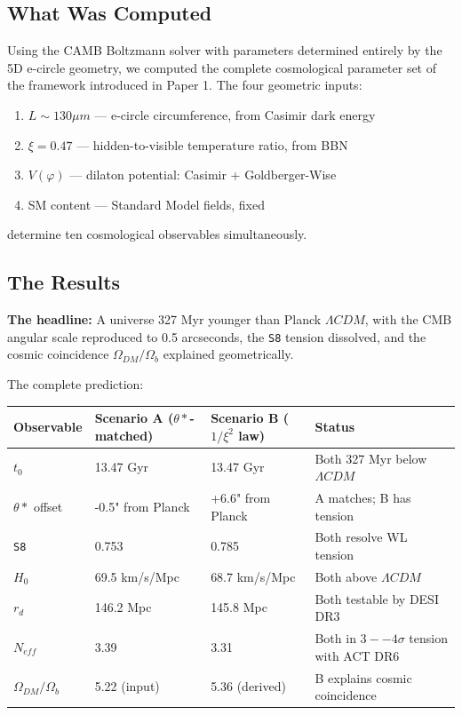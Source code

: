 \documentclass[aps,prd,preprint,superscriptaddress,longbibliography]{revtex4-2}
\begin{document}
\clearpage


\subsection{What Was Computed}

Using the CAMB Boltzmann solver with parameters determined entirely by the 5D e-circle geometry, we computed the complete cosmological parameter set of the framework introduced in Paper 1. The four geometric inputs:


\begin{enumerate}
  \item $L \sim  130 \mu m$ --- e-circle circumference, from Casimir dark energy
  \item $\xi = 0.47$ --- hidden-to-visible temperature ratio, from BBN
  \item $V(\varphi)$ --- dilaton potential: Casimir + Goldberger-Wise
  \item SM content --- Standard Model fields, fixed
\end{enumerate}

determine ten cosmological observables simultaneously.


\subsection{The Results}

\textbf{The headline:} A universe 327 Myr younger than Planck $\Lambda CDM$, with the CMB angular scale reproduced to 0.5 arcseconds, the \texttt{S8} tension dissolved, and the cosmic coincidence $\Omega_{DM}/\Omega_b$ explained geometrically.

The complete prediction:


\begin{table}[H]
\begin{ruledtabular}
\begin{tabular}{p{3.8cm}p{3.8cm}p{3.8cm}p{3.8cm}}
Observable & Scenario A ($\theta*$-matched) & Scenario B ($1/\xi^{2}$ law) & Status \\
\hline
$t_{0}$ & 13.47 Gyr & 13.47 Gyr & Both 327 Myr below $\Lambda CDM$ \\
$\theta*$ offset & -0.5" from Planck & +6.6" from Planck & A matches; B has tension \\
\texttt{S8} & 0.753 & 0.785 & Both resolve WL tension \\
$H_{0}$ & 69.5 km/s/Mpc & 68.7 km/s/Mpc & Both above $\Lambda CDM$ \\
$r_d$ & 146.2 Mpc & 145.8 Mpc & Both testable by DESI DR3 \\
$N_{eff}$ & 3.39 & 3.31 & Both in $3--4\sigma$ tension with ACT DR6 \\
$\Omega_{DM}/\Omega_b$ & 5.22 (input) & 5.36 (derived) & B explains cosmic coincidence \\
\end{tabular}
\end{ruledtabular}
\end{table}
\end{document}
